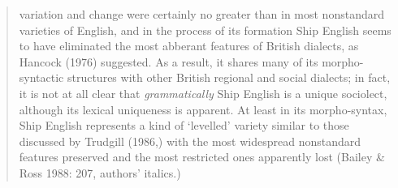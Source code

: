 \documentclass[12pt]{article}
\begin{document}
\begin{quotation}
variation and change were certainly no greater than in most nonstandard varieties of English, and in the process of its formation Ship English seems to have eliminated the most abberant features of British dialects, as Hancock (1976) suggested. As a result, it shares many of its morpho-syntactic structures with other British regional and social dialects; in fact, it is not at all clear that \textit{grammatically} Ship English is a unique sociolect, although its lexical uniqueness is apparent. At least in its morpho-syntax, Ship English represents a kind of ‘levelled’ variety similar to those discussed by Trudgill (1986,) with the most widespread nonstandard features preserved and the most restricted ones apparently lost (Bailey \& Ross 1988: 207, authors’ italics.) 

\end{quotation}
\end{document}
